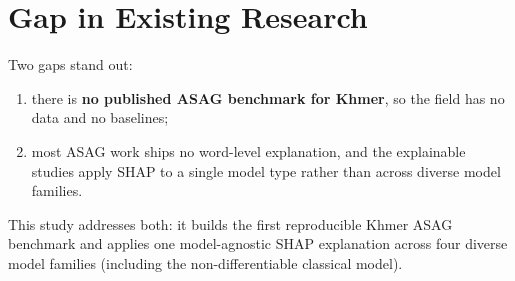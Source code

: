 \section{Gap in Existing Research}
\label{sec:lit-gap}
Two gaps stand out:

\begin{enumerate}[leftmargin=1.8em]
  \item there is \textbf{no published ASAG benchmark for Khmer}, so the field has no data and no
  baselines;
  \item most ASAG work ships no word-level explanation, and the explainable studies apply SHAP to a
  single model type rather than across diverse model families.
\end{enumerate}

This study addresses both: it builds the first reproducible Khmer ASAG benchmark and applies one
model-agnostic SHAP explanation across four diverse model families (including the non-differentiable
classical model).
